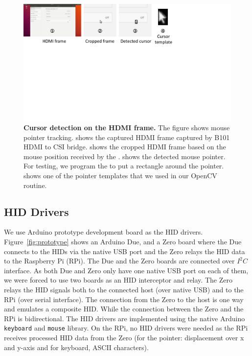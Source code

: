 \begin{figure}[t]
\centering
\includegraphics[trim={0 12cm 10cm 0}, clip, width=\linewidth]{chapters/ProtectIOn/images/cursorDetect.pdf}
\caption[Cursor detection on the HDMI frame]{\textbf{Cursor detection on the HDMI frame.} The figure shows \name mouse pointer tracking. \one shows the captured HDMI frame captured by B101 HDMI to CSI bridge. \two shows the cropped HDMI frame based on the mouse position received by the \device. \three shows the detected mouse pointer. For testing, we program the \device to put a rectangle around the pointer. \four shows one of the pointer templates that we used in our OpenCV routine.}
\label{fig:cursorDetect}
\centering
\end{figure} 


\subsection{HID Drivers}
We use Arduino prototype development board as the HID drivers. Figure~\ref{fig:prototype} shows an Arduino Due, and a Zero board where the Due connects to the HIDs via the native USB port and the Zero relays the HID data to the Raspberry Pi (RPi). The Due and the Zero boards are connected over $I^2C$ interface. As both Due and Zero only have one native USB port on each of them, we were forced to use two boards as an HID interceptor and relay. The Zero relays the HID signals both to the connected host (over native USB) and to the RPi (over serial interface). The connection from the Zero to the host is one way and emulates a composite HID. While the connection between the Zero and the RPi is bidirectional. The HID drivers are implemented using the native Arduino \texttt{keyboard} and \texttt{mouse} library. On the RPi, no HID drivers were needed as the RPi receives processed HID data from the Zero (for the pointer: displacement over x and y-axis and for keyboard, ASCII characters).


